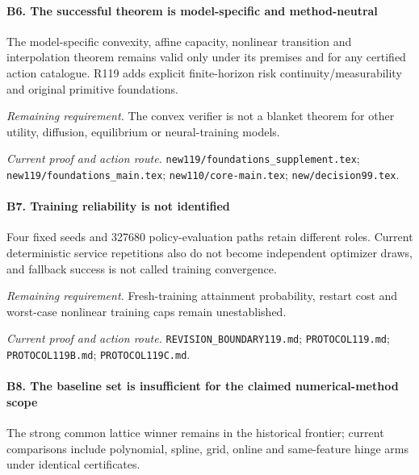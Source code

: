 \paragraph{B6. The successful theorem is model-specific and method-neutral}

The model-specific convexity, affine capacity, nonlinear transition and interpolation theorem remains valid only under its premises and for any certified action catalogue. R119 adds explicit finite-horizon risk continuity/\allowbreak{}measurability and original primitive foundations.

\par\emph{Remaining requirement.} The convex verifier is not a blanket theorem for other utility, diffusion, equilibrium or neural-training models.

\par\emph{Current proof and action route.} \nolinkurl{new119/foundations_supplement.tex}; \nolinkurl{new119/foundations_main.tex}; \nolinkurl{new110/core-main.tex}; \nolinkurl{new/decision99.tex}.

\paragraph{B7. Training reliability is not identified}

Four fixed seeds and 327680 policy-evaluation paths retain different roles. Current deterministic service repetitions also do not become independent optimizer draws, and fallback success is not called training convergence.

\par\emph{Remaining requirement.} Fresh-training attainment probability, restart cost and worst-case nonlinear training caps remain unestablished.

\par\emph{Current proof and action route.} \nolinkurl{REVISION_BOUNDARY119.md}; \nolinkurl{PROTOCOL119.md}; \nolinkurl{PROTOCOL119B.md}; \nolinkurl{PROTOCOL119C.md}.

\paragraph{B8. The baseline set is insufficient for the claimed numerical-method scope}

The strong common lattice winner remains in the historical frontier; current comparisons include polynomial, spline, grid, online and same-feature hinge arms under identical certificates.

